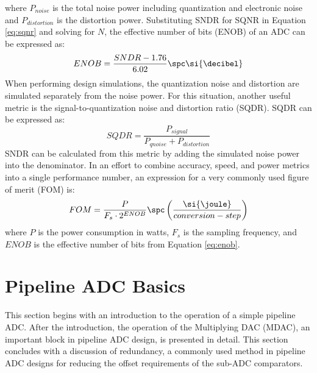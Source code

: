 where $P_{noise}$ is the total noise power including quantization and electronic noise and $P_{distortion}$ is the distortion power. Substituting SNDR for SQNR in Equation \ref{eq:sqnr} and solving for $N$, the effective number of bits (ENOB) of an ADC can be expressed as:
\begin{equation}
\label{eq:enob}
ENOB = \dfrac{SNDR-1.76}{6.02}\spc\si{\decibel}
\end{equation}
When performing design simulations, the quantization noise and distortion are simulated separately from the noise power. For this situation, another useful metric is the signal-to-quantization noise and distortion ratio (SQDR). SQDR can be expressed as:
\begin{equation}
\label{eq:sqdr}
SQDR = \dfrac{P_{signal}}{P_{qnoise}+P_{distortion}}
\end{equation}
SNDR can be calculated from this metric by adding the simulated noise power into the denominator. In an effort to combine accuracy, speed, and power metrics into a single performance number, an expression for a very commonly used figure of merit (FOM) is:
\begin{equation}
\label{eq:fom}
FOM = \dfrac{P}{F_{s}\cdot2^{ENOB}}\spc \left(\dfrac{\si{\joule}}{conversion-step}\right)
\end{equation}
where $P$ is the power consumption in watts, $F_{s}$ is the sampling frequency, and $ENOB$ is the effective number of bits from Equation \ref{eq:enob}. 
\section{Pipeline ADC Basics}
\label{sec:pipelineadcbasics}
This section begins with an introduction to the operation of a simple pipeline ADC. After the introduction, the operation of the Multiplying DAC (MDAC), an important block in pipeline ADC design, is presented in detail. This 
section concludes with a discussion of redundancy, a commonly used method in pipeline ADC designs for reducing the offset requirements of the sub-ADC comparators.
